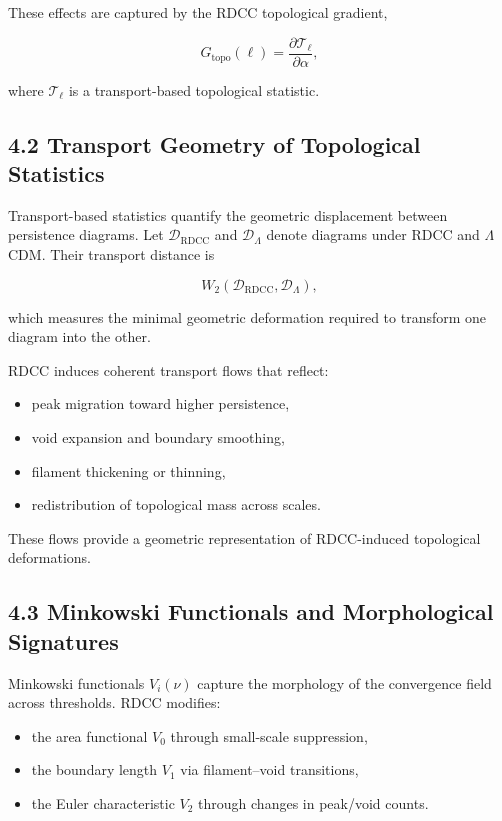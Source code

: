 \documentclass[11pt,a4paper]{article}
\begin{document}
These effects are captured by the RDCC topological gradient,


\[
    G_{\mathrm{topo}}(\ell)
    =
    \frac{\partial \mathcal{T}_{\ell}}{\partial \alpha},
\]


where $\mathcal{T}_{\ell}$ is a transport-based topological statistic.

\subsection*{4.2 Transport Geometry of Topological Statistics}

Transport-based statistics quantify the geometric displacement between 
persistence diagrams. Let $\mathcal{D}_{\mathrm{RDCC}}$ and 
$\mathcal{D}_{\Lambda}$ denote diagrams under RDCC and $\Lambda$CDM. Their 
transport distance is



\[
    W_{2}
    \left(
        \mathcal{D}_{\mathrm{RDCC}},
        \mathcal{D}_{\Lambda}
    \right),
\]


which measures the minimal geometric deformation required to transform one 
diagram into the other.

RDCC induces coherent transport flows that reflect:

\begin{itemize}
    \item peak migration toward higher persistence,
    \item void expansion and boundary smoothing,
    \item filament thickening or thinning,
    \item redistribution of topological mass across scales.
\end{itemize}

These flows provide a geometric representation of RDCC-induced topological 
deformations.

\subsection*{4.3 Minkowski Functionals and Morphological Signatures}

Minkowski functionals $V_{i}(\nu)$ capture the morphology of the convergence 
field across thresholds. RDCC modifies:

\begin{itemize}
    \item the area functional $V_{0}$ through small-scale suppression,
    \item the boundary length $V_{1}$ via filament–void transitions,
    \item the Euler characteristic $V_{2}$ through changes in peak/void counts.
\end{itemize}
\end{document}
